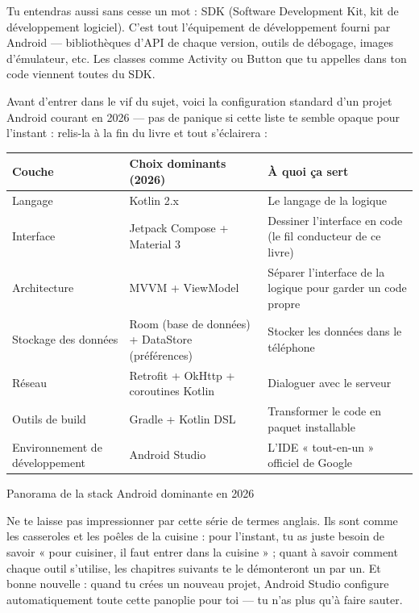 Tu entendras aussi sans cesse un mot : SDK (Software Development Kit, kit de développement logiciel). C'est tout l'équipement de développement fourni par Android — bibliothèques d'API de chaque version, outils de débogage, images d'émulateur, etc. Les classes comme Activity ou Button que tu appelles dans ton code viennent toutes du SDK.


Avant d'entrer dans le vif du sujet, voici la configuration standard d'un projet Android courant en 2026 — pas de panique si cette liste te semble opaque pour l'instant : relis-la à la fin du livre et tout s'éclairera :

\begin{center}
\begin{tabularx}{\linewidth}{|X|X|X|}
\hline
\textbf{Couche} & \textbf{Choix dominants (2026)} & \textbf{À quoi ça sert} \tabularnewline
\hline
Langage & Kotlin 2.x & Le langage de la logique \tabularnewline
Interface & Jetpack Compose + Material 3 & Dessiner l'interface en code (le fil conducteur de ce livre) \tabularnewline
Architecture & MVVM + ViewModel & Séparer l'interface de la logique pour garder un code propre \tabularnewline
Stockage des données & Room (base de données) + DataStore (préférences) & Stocker les données dans le téléphone \tabularnewline
Réseau & Retrofit + OkHttp + coroutines Kotlin & Dialoguer avec le serveur \tabularnewline
Outils de build & Gradle + Kotlin DSL & Transformer le code en paquet installable \tabularnewline
Environnement de développement & Android Studio & L'IDE « tout-en-un » officiel de Google \tabularnewline
\hline
\end{tabularx}
\end{center}

\begin{center}\small\color{gray}Panorama de la stack Android dominante en 2026\end{center}

Ne te laisse pas impressionner par cette série de termes anglais. Ils sont comme les casseroles et les poêles de la cuisine : pour l'instant, tu as juste besoin de savoir « pour cuisiner, il faut entrer dans la cuisine » ; quant à savoir comment chaque outil s'utilise, les chapitres suivants te le démonteront un par un. Et bonne nouvelle : quand tu crées un nouveau projet, Android Studio configure automatiquement toute cette panoplie pour toi — tu n'as plus qu'à faire sauter.


